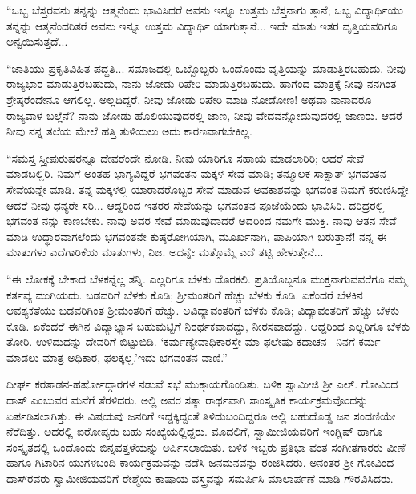 “ಒಬ್ಬ ಬೆಸ್ತರವನು ತನ್ನನ್ನು ಆತ್ಮನೆಂದು ಭಾವಿಸಿದರೆ ಅವನು ಇನ್ನೂ ಉತ್ತಮ ಬೆಸ್ತನಾಗು ತ್ತಾನೆ; ಒಬ್ಬ ವಿದ್ಯಾರ್ಥಿಯು ತನ್ನನ್ನು ಆತ್ಮನೆಂದರಿತರೆ ಅವನು ಇನ್ನೂ ಉತ್ತಮ ವಿದ್ಯಾರ್ಥಿ ಯಾಗುತ್ತಾನೆ... ಇದೇ ಮಾತು ಇತರ ವೃತ್ತಿಯವರಿಗೂ ಅನ್ವಯಿಸುತ್ತದೆ... 

“ಜಾತಿಯು ಪ್ರಕೃತಿವಿಹಿತ ಪದ್ಧತಿ... ಸಮಾಜದಲ್ಲಿ ಒಬ್ಬೊಬ್ಬರು ಒಂದೊಂದು ವೃತ್ತಿಯನ್ನು ಮಾಡುತ್ತಿರಬಹುದು. ನೀವು ರಾಜ್ಯಭಾರ ಮಾಡುತ್ತಿರಬಹುದು, ನಾನು ಜೋಡು ರಿಪೇರಿ ಮಾಡುತ್ತಿರಬಹುದು. ಹಾಗೆಂದ ಮಾತ್ರಕ್ಕೆ ನೀವು ನನಗಿಂತ ಶ್ರೇಷ್ಠರೆಂದೇನೂ ಆಗಲಿಲ್ಲ. ಅಲ್ಲದಿದ್ದರೆ, ನೀವು ಜೋಡು ರಿಪೇರಿ ಮಾಡಿ ನೋಡೋಣ! ಅಥವಾ ನಾನಾದರೂ ರಾಜ್ಯವಾಳ ಬಲ್ಲೆನೆ? ನಾನು ಜೋಡು ಹೊಲಿಯುವುದರಲ್ಲಿ ಜಾಣ, ನೀವು ವೇದವನ್ನೋದುವುದರಲ್ಲಿ ಜಾಣರು. ಆದರೆ ನೀವು ನನ್ನ ತಲೆಯ ಮೇಲೆ ಹತ್ತಿ ತುಳಿಯಲು ಅದು ಕಾರಣವಾಗಬೇಕಿಲ್ಲ.

“ಸಮಸ್ತ ಸ್ತ್ರೀಪುರುಷರನ್ನೂ ದೇವರೆಂದೇ ನೋಡಿ. ನೀವು ಯಾರಿಗೂ ಸಹಾಯ ಮಾಡಲಾರಿರಿ; ಆದರೆ ಸೇವೆ ಮಾಡಬಲ್ಲಿರಿ. ನಿಮಗೆ ಅಂತಹ ಭಾಗ್ಯವಿದ್ದರೆ ಭಗವಂತನ ಮಕ್ಕಳ ಸೇವೆ ಮಾಡಿ; ತನ್ಮೂಲಕ ಸಾಕ್ಷಾತ್ ಭಗವಂತನ ಸೇವೆಯನ್ನೇ ಮಾಡಿ. ತನ್ನ ಮಕ್ಕಳಲ್ಲಿ ಯಾರಾದರೊಬ್ಬರ ಸೇವೆ ಮಾಡುವ ಅವಕಾಶವನ್ನು ಭಗವಂತ ನಿಮಗೆ ಕರುಣಿಸಿದ್ದೇ ಆದರೆ ನೀವು ಧನ್ಯರೇ ಸರಿ... ಆದ್ದರಿಂದ ಇತರರ ಸೇವೆಯನ್ನು ಭಗವಂತನ ಪೂಜೆಯೆಂದು ಭಾವಿಸಿರಿ. ದರಿದ್ರರಲ್ಲಿ ಭಗವಂತ ನನ್ನು ಕಾಣಬೇಕು. ನಾವು ಅವರ ಸೇವೆ ಮಾಡುವುದಾದರೆ ಅದರಿಂದ ನಮಗೇ ಮುಕ್ತಿ. ನಾವು ಆತನ ಸೇವೆ ಮಾಡಿ ಉದ್ಧಾರವಾಗಲೆಂದು ಭಗವಂತನೇ ಕುಷ್ಠರೋಗಿಯಾಗಿ, ಮೂರ್ಖನಾಗಿ, ಪಾಪಿಯಾಗಿ ಬರುತ್ತಾನೆ! ನನ್ನ ಈ ಮಾತುಗಳು ಎದೆಗಾರಿಕೆಯ ಮಾತುಗಳು, ನಿಜ. ಅದನ್ನೇ ಮತ್ತೊಮ್ಮೆ ಎದೆ ತಟ್ಟಿ ಹೇಳುತ್ತೇನೆ... 

“ಈ ಲೋಕಕ್ಕೆ ಬೇಕಾದ ಬೆಳಕನ್ನೆಲ್ಲ ತನ್ನಿ. ಎಲ್ಲರಿಗೂ ಬೆಳಕು ದೊರಕಲಿ. ಪ್ರತಿಯೊಬ್ಬನೂ ಮುಕ್ತನಾಗುವವರೆಗೂ ನಮ್ಮ ಕರ್ತವ್ಯ ಮುಗಿಯದು. ಬಡವರಿಗೆ ಬೆಳಕು ಕೊಡಿ; ಶ್ರೀಮಂತರಿಗೆ ಹೆಚ್ಚು ಬೆಳಕು ಕೊಡಿ. ಏಕೆಂದರೆ ಬೆಳಕಿನ ಆವಶ್ಯಕತೆಯು ಬಡವರಿಗಿಂತ ಶ್ರೀಮಂತರಿಗೆ ಹೆಚ್ಚು. ಅವಿದ್ಯಾವಂತರಿಗೆ ಬೆಳಕು ಕೊಡಿ; ವಿದ್ಯಾವಂತರಿಗೆ ಹೆಚ್ಚು ಬೆಳಕು ಕೊಡಿ. ಏಕೆಂದರೆ ಈಗಿನ ವಿದ್ಯಾಭ್ಯಾಸ ಬಹುಮಟ್ಟಿಗೆ ನಿರರ್ಥಕವಾದದ್ದು, ನೀರಸವಾದದ್ದು. ಆದ್ದರಿಂದ ಎಲ್ಲರಿಗೂ ಬೆಳಕು ತೋರಿ. ಉಳಿದುದನ್ನು ದೇವರಿಗೆ ಬಿಟ್ಟುಬಿಡಿ. ‘ಕರ್ಮಣ್ಯೇವಾಧಿಕಾರಸ್ತೇ ಮಾ ಫಲೇಷು ಕದಾಚನ –ನಿನಗೆ ಕರ್ಮ ಮಾಡಲು ಮಾತ್ರ ಅಧಿಕಾರ, ಫಲಕ್ಕಲ್ಲ.’ಇದು ಭಗವಂತನ ವಾಣಿ.”

ದೀರ್ಘ ಕರತಾಡನ-ಹರ್ಷೋದ್ಗಾರಗಳ ನಡುವೆ ಸಭೆ ಮುಕ್ತಾಯಗೊಂಡಿತು. ಬಳಿಕ ಸ್ವಾಮೀಜಿ ಶ್ರೀ ಎಲ್. ಗೋವಿಂದ ದಾಸ್ ಎಂಬುವರ ಮನೆಗೆ ತೆರಳಿದರು. ಅಲ್ಲಿ ಅವರ ಸತ್ಕಾ ರಾರ್ಥವಾಗಿ ಸಾಂಸ್ಕೃತಿಕ ಕಾರ್ಯಕ್ರಮವೊಂದನ್ನು ಏರ್ಪಡಿಸಲಾಗಿತ್ತು. ಈ ವಿಷಯವು ಜನರಿಗೆ ಇದ್ದಕ್ಕಿದ್ದಂತೆ ತಿಳಿದುಬಂದಿದ್ದರೂ ಅಲ್ಲಿ ಬಹುದೊಡ್ಡ ಜನ ಸಂದಣಿಯೇ ನೆರೆದಿತ್ತು. ಅದರಲ್ಲಿ ಐರೋಪ್ಯರು ಬಹು ಸಂಖ್ಯೆಯಲ್ಲಿದ್ದರು. ಮೊದಲಿಗೆ, ಸ್ವಾಮೀಜಿಯವರಿಗೆ ಇಂಗ್ಲಿಷ್ ಹಾಗೂ ಸಂಸ್ಕೃತದಲ್ಲಿ ಒಂದೊಂದು ಬಿನ್ನವತ್ತಳೆಯನ್ನು ಅರ್ಪಿಸಲಾಯಿತು. ಬಳಿಕ ಇಬ್ಬರು ಪ್ರತಿಭಾ ವಂತ ಸಂಗೀತಗಾರರು ವೀಣೆ ಹಾಗೂ ಗಿಟಾರಿನ ಯುಗಳಬಂದಿ ಕಾರ್ಯಕ್ರಮವನ್ನು ನಡೆಸಿ ಜನಮನವನ್ನು ರಂಜಿಸಿದರು. ಅನಂತರ ಶ್ರೀ ಗೋವಿಂದ ದಾಸ್​ರವರು ಸ್ವಾಮೀಜಿಯವರಿಗೆ ರೇಶ್ಮೆಯ ಕಾಷಾಯ ವಸ್ತ್ರವನ್ನು ಸಮರ್ಪಿಸಿ ಮಾಲಾರ್ಪಣೆ ಮಾಡಿ ಗೌರವಿಸಿದರು.

